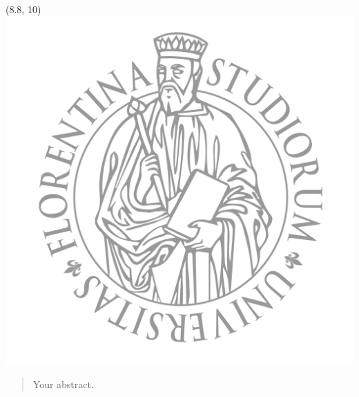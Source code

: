 \begin{titlepage}
    \begin{textblock}{2}(8.8, 10)  %
        \includegraphics[width=14cm]{img/logo_unifi_bg.png}
    \end{textblock}
\end{titlepage}

\newpage

\begin{abstract}

Your abstract.

\end{abstract}
\newpage

\pagestyle{plain}     %

\tableofcontents
\newpage

